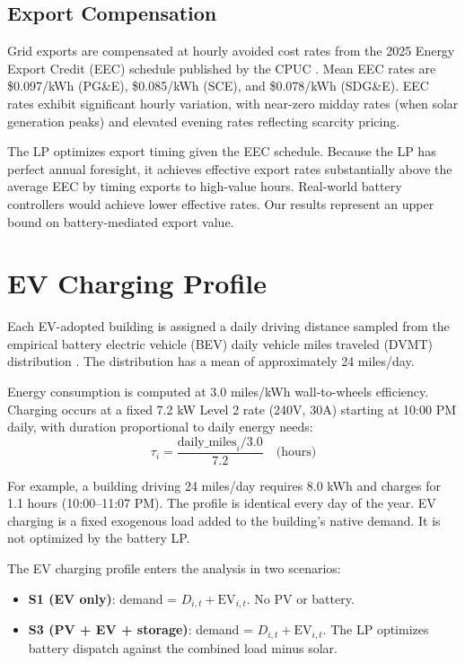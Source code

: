 \documentclass[11pt]{article}
\begin{document}
\subsection{Export Compensation}

Grid exports are compensated at hourly avoided cost rates from the 2025 Energy Export Credit (EEC) schedule published by the CPUC \cite{cpuc_nbt2023}. Mean EEC rates are \$0.097/kWh (PG\&E), \$0.085/kWh (SCE), and \$0.078/kWh (SDG\&E). EEC rates exhibit significant hourly variation, with near-zero midday rates (when solar generation peaks) and elevated evening rates reflecting scarcity pricing.

The LP optimizes export timing given the EEC schedule. Because the LP has perfect annual foresight, it achieves effective export rates substantially above the average EEC by timing exports to high-value hours. Real-world battery controllers would achieve lower effective rates. Our results represent an upper bound on battery-mediated export value.

\section{EV Charging Profile}
\label{sec:ev}

Each EV-adopted building is assigned a daily driving distance sampled from the empirical battery electric vehicle (BEV) daily vehicle miles traveled (DVMT) distribution \cite{vehicletrends}. The distribution has a mean of approximately 24 miles/day.

Energy consumption is computed at 3.0 miles/kWh wall-to-wheels efficiency. Charging occurs at a fixed 7.2 kW Level 2 rate (240V, 30A) starting at 10:00 PM daily, with duration proportional to daily energy needs:
\begin{equation}
\tau_i = \frac{\text{daily\_miles}_i / 3.0}{7.2} \quad \text{(hours)}
\end{equation}

For example, a building driving 24 miles/day requires 8.0 kWh and charges for 1.1 hours (10:00--11:07 PM). The profile is identical every day of the year. EV charging is a fixed exogenous load added to the building's native demand. It is not optimized by the battery LP.

The EV charging profile enters the analysis in two scenarios:
\begin{itemize}
\item \textbf{S1 (EV only)}: demand = $D_{i,t} + \text{EV}_{i,t}$. No PV or battery.
\item \textbf{S3 (PV + EV + storage)}: demand = $D_{i,t} + \text{EV}_{i,t}$. The LP optimizes battery dispatch against the combined load minus solar.
\end{itemize}
\end{document}

